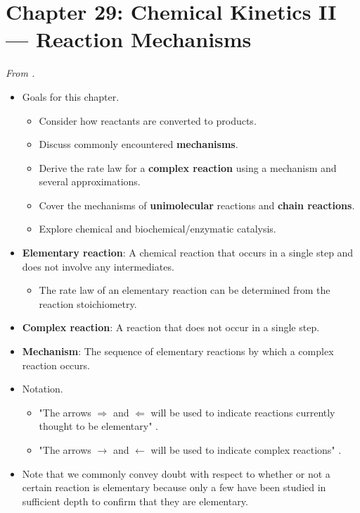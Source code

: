 \documentclass[../notes.tex]{subfiles}
\begin{document}
\section{Chapter 29: Chemical Kinetics II --- Reaction Mechanisms}
\emph{From \textcite{bib:McQuarrieSimon}.}
\begin{itemize}
    \item Goals for this chapter.
    \begin{itemize}
        \item Consider how reactants are converted to products.
        \item Discuss commonly encountered \textbf{mechanisms}.
        \item Derive the rate law for a \textbf{complex reaction} using a mechanism and several approximations.
        \item Cover the mechanisms of \textbf{unimolecular} reactions and \textbf{chain reactions}.
        \item Explore chemical and biochemical/enzymatic catalysis.
    \end{itemize}
    \item \textbf{Elementary reaction}: A chemical reaction that occurs in a single step and does not involve any intermediates.
    \begin{itemize}
        \item The rate law of an elementary reaction can be determined from the reaction stoichiometry.
    \end{itemize}
    \item \textbf{Complex reaction}: A reaction that does not occur in a single step.
    \item \textbf{Mechanism}: The sequence of elementary reactions by which a complex reaction occurs.
    \item Notation.
    \begin{itemize}
        \item "The arrows $\Rightarrow$ and $\Leftarrow$ will be used to indicate reactions currently thought to be elementary" \parencite[1182]{bib:McQuarrieSimon}.
        \item "The arrows $\rightarrow$ and $\leftarrow$ will be used to indicate complex reactions" \parencite[1182]{bib:McQuarrieSimon}.
    \end{itemize}
    \item Note that we commonly convey doubt with respect to whether or not a certain reaction is elementary because only a few have been studied in sufficient depth to confirm that they are elementary.

\end{itemize}
\end{document}
